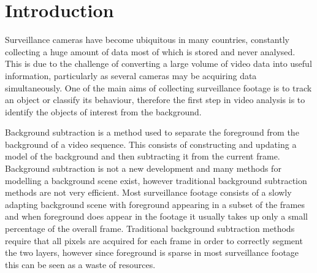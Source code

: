 

\section{Introduction}
Surveillance cameras have become ubiquitous in many countries, constantly collecting a huge amount of data most of which is stored and never analysed. This is due to the challenge of converting a large volume of video data into useful information, particularly as several cameras may be acquiring data simultaneously. One of the main aims of collecting surveillance footage is to track an object or classify its behaviour, therefore the first step in video analysis is to identify the objects of interest from the background.


Background subtraction \citep{Piccardi2004a} is a method used to separate the foreground from the background of a video sequence. This consists of constructing and updating a model of the background and then subtracting it from the current frame. Background subtraction is not a new development and many methods for modelling a background scene exist, however traditional background subtraction methods are not very efficient. Most surveillance footage consists of a slowly adapting background scene with foreground appearing in a subset of the frames and when foreground does appear in the footage it usually takes up only a small percentage of the overall frame. Traditional background subtraction methods require that all pixels are acquired for each frame in order to correctly segment the two layers, however since foreground is sparse in most surveillance footage this can be seen as a waste of resources. 

